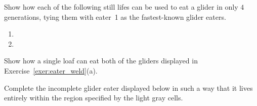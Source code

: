 \begin{multicols}{2}
\begin{problem}
		\begin{center}
		\end{center}
	\end{problem}
	
	
	\mfilbreak
	
	
	\begin{problemstar}\label{exer:fast_glider_eater} 
		Show how each of the following still lifes can be used to eat a glider in only $4$ generations, tying them with eater~1 as the fastest-known glider eaters.\vspace*{-0.25cm}
		
		\begin{multicols}{2}
			\begin{enumerate}
				\item[\bf\color{ocre}(a)] 
				
				\item[\bf\color{ocre}(b)] 
			\end{enumerate}
		\end{multicols}
	\end{problemstar}
	
	
	\mfilbreak
	
	
	\begin{problem}\label{exer:loaf_eater} 
		Show how a single loaf can eat both of the gliders displayed in Exercise~\ref{exer:eater_weld}(a).
	\end{problem}
	
	
	\mfilbreak
	
	
	\begin{problemstar}\label{exer:incomplete_glider_eater} 
		Complete the incomplete glider eater displayed below in such a way that it lives entirely within the region specified by the light gray cells.
		
		\begin{center}
		\end{center}
	\end{problemstar}
	
	
	\mfilbreak
	

\end{multicols}
